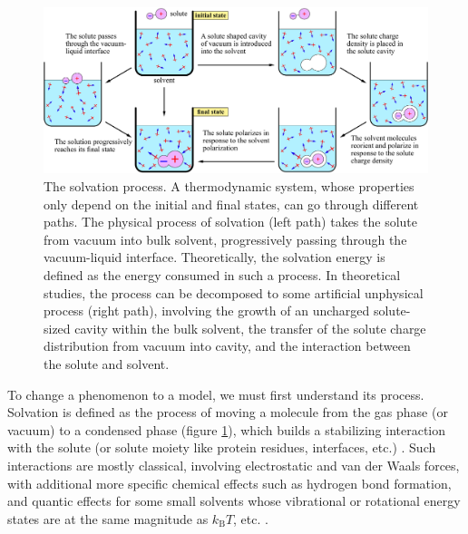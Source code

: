 \begin{figure}[h]
\centering{}\textcolor{red}{}%
\begin{minipage}[t]{1\textwidth}%
\begin{center}
\includegraphics[width=1\columnwidth]{_figure/solvation}\caption[The solvation process]{The solvation process.\label{fig:Process-of-solvation} A thermodynamic
system, whose properties only depend on the initial and final states,
can go through different paths. The physical process of solvation
(left path) takes the solute from vacuum into bulk solvent, progressively
passing through the vacuum-liquid interface. Theoretically, the solvation
energy is defined as the energy consumed in such a process. In theoretical
studies, the process can be decomposed to some artificial unphysical
process (right path), involving the growth of an uncharged solute-sized
cavity within the bulk solvent, the transfer of the solute charge
distribution from vacuum into cavity, and the interaction between
the solute and solvent.}

\par\end{center}%
\end{minipage}
\end{figure}


To change a phenomenon to a model, we must first understand its process.
Solvation is defined as the process of moving a molecule from the
gas phase (or vacuum) to a condensed phase (figure \ref{fig:Process-of-solvation}),
which builds a stabilizing interaction with the solute (or solute
moiety like protein residues, interfaces, etc.) \citep{iupac}. Such
interactions are mostly classical, involving electrostatic
and van der Waals forces, with additional more specific chemical effects
such as hydrogen bond formation, and quantic effects for some small
solvents whose vibrational or rotational energy states are at the same
magnitude as $k_{\mathrm{B}}T$, etc. \citep{Gray-Gubbins}.

